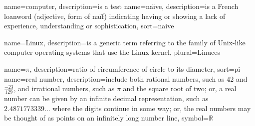 {
  name=computer,
  description={is a test}
}
{
  name=na\"{\i}ve,
  description={is a French loanword (adjective, form of naïf)
               indicating having or showing a lack of experience,
               understanding or sophistication},
  sort=naive
}

{
  name=Linux,
  description={is a generic term referring to the family of Unix-like
               computer operating systems that use the Linux kernel},
  plural=Linuces}

{
  name={\ensuremath{\pi}},
  description={ratio of circumference of circle to its
               diameter},
  sort=pi
}
{
  name={real number},
  description={include both rational numbers, such as $42$ and
               $\frac{-23}{129}$, and irrational numbers,
               such as $\pi$ and the square root of two; or,
               a real number can be given by an infinite decimal
               representation, such as $2.4871773339\ldots$ where
               the digits continue in some way; or, the real
               numbers may be thought of as points on an infinitely
               long number line},
  symbol={\ensuremath{\mathbb{R}}}
}
